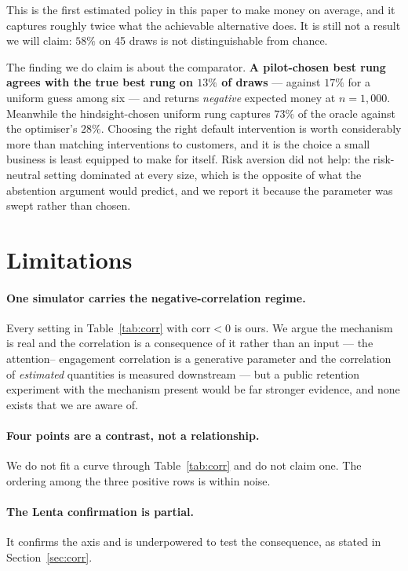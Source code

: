 \documentclass[11pt,a4paper]{article}
\newcommand{\corr}{\mathrm{corr}}
\begin{document}
This is the first estimated policy in this paper to make money on average, and it
captures roughly twice what the achievable alternative does. It is still not a result we
will claim: $58\%$ on 45 draws is not distinguishable from chance.

The finding we do claim is about the comparator. \textbf{A pilot-chosen best rung agrees
with the true best rung on $13\%$ of draws} --- against $17\%$ for a uniform guess among
six --- and returns \emph{negative} expected money at $n = 1{,}000$. Meanwhile the
hindsight-chosen uniform rung captures $73\%$ of the oracle against the optimiser's
$28\%$. Choosing the right default intervention is worth considerably more than matching
interventions to customers, and it is the choice a small business is least equipped to
make for itself. Risk aversion did not help: the risk-neutral setting dominated at every
size, which is the opposite of what the abstention argument would predict, and we report
it because the parameter was swept rather than chosen.

\section{Limitations}
\label{sec:limitations}

\paragraph{One simulator carries the negative-correlation regime.} Every setting in
Table~\ref{tab:corr} with $\corr < 0$ is ours. We argue the mechanism is real and
the correlation is a consequence of it rather than an input --- the attention--%
engagement correlation is a generative parameter and the correlation of
\emph{estimated} quantities is measured downstream --- but a public retention
experiment with the mechanism present would be far stronger evidence, and none
exists that we are aware of.

\paragraph{Four points are a contrast, not a relationship.} We do not fit a curve
through Table~\ref{tab:corr} and do not claim one. The ordering among the three
positive rows is within noise.

\paragraph{The Lenta confirmation is partial.} It confirms the axis and is
underpowered to test the consequence, as stated in Section~\ref{sec:corr}.
\end{document}
